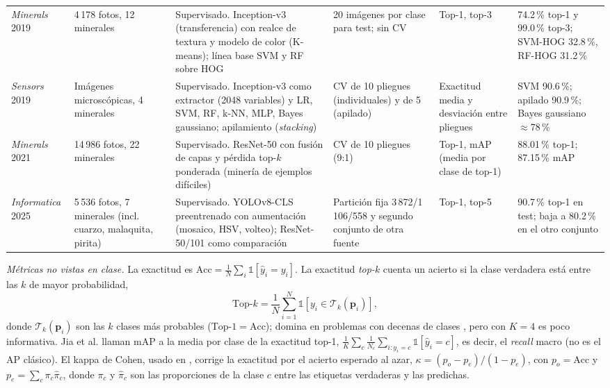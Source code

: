 \documentclass[journal]{IEEEtran}
\begin{document}
\begin{table}[!t]
\begin{tabular}{@{}p{1.55cm} p{2.25cm} p{4.0cm} p{1.9cm} p{1.5cm} p{4.4cm}@{}}
\cite{liu2019}\newline\emph{Minerals} 2019 & 4\,178 fotos, 12 minerales & Supervisado. Inception-v3 (transferencia) con realce de textura y modelo de color (K-means); línea base SVM y RF sobre HOG & 20 imágenes por clase para test; sin CV & Top-1, top-3 & 74.2\,\% top-1 y 99.0\,\% top-3; SVM-HOG 32.8\,\%, RF-HOG 31.2\,\%\\
\cite{zhang2019}\newline\emph{Sensors} 2019 & Imágenes microscópicas, 4 minerales & Supervisado. Inception-v3 como extractor (2048 variables) y LR, SVM, RF, k-NN, MLP, Bayes gaussiano; apilamiento (\emph{stacking}) & CV de 10 pliegues (individuales) y de 5 (apilado) & Exactitud media y desviación entre pliegues & SVM 90.6\,\%; apilado 90.9\,\%; Bayes gaussiano $\approx$78\,\%\\
\cite{jia2021}\newline\emph{Minerals} 2021 & 14\,986 fotos, 22 minerales & Supervisado. ResNet-50 con fusión de capas y pérdida top-$k$ ponderada (minería de ejemplos difíciles) & CV de 10 pliegues (9:1) & Top-1, mAP (media por clase de top-1) & 88.01\,\% top-1; 87.15\,\% mAP\\
\cite{long2025}\newline\emph{Informatica} 2025 & 5\,536 fotos, 7 minerales (incl. cuarzo, malaquita, pirita) & Supervisado. YOLOv8-CLS preentrenado con aumentación (mosaico, HSV, volteo); ResNet-50/101 como comparación & Partición fija 3\,872/1\,106/558 y segundo conjunto de otra fuente & Top-1, top-5 & 90.7\,\% top-1 en test; baja a 80.2\,\% en el otro conjunto\\
\bottomrule
\end{tabular}
\end{table}

\emph{Métricas no vistas en clase.} La exactitud es $\mathrm{Acc}=\tfrac1N\sum_{i}\mathbb 1[\hat y_i=y_i]$. La exactitud \emph{top-$k$} cuenta un acierto si la clase verdadera está entre las $k$ de mayor probabilidad,
\begin{equation}
\mathrm{Top}\text{-}k=\frac1N\sum_{i=1}^{N}\mathbb 1\!\left[y_i\in\mathcal T_k(\mathbf p_i)\right],
\end{equation}
donde $\mathcal T_k(\mathbf p_i)$ son las $k$ clases más probables ($\mathrm{Top}\text{-}1=\mathrm{Acc}$); domina en problemas con decenas de clases \cite{chow2022,jia2021,zeng2021,long2025}, pero con $K=4$ es poco informativa. Jia et al. \cite{jia2021} llaman mAP a la media por clase de la exactitud top-1, $\frac1K\sum_{c}\frac1{N_c}\sum_{i:y_i=c}\mathbb 1[\hat y_i=c]$, es decir, el \emph{recall} macro (no es el AP clásico). El kappa de Cohen, usado en \cite{maitre2019}, corrige la exactitud por el acierto esperado al azar, $\kappa=(p_o-p_e)/(1-p_e)$, con $p_o=\mathrm{Acc}$ y $p_e=\sum_{c}\pi_c\hat\pi_c$, donde $\pi_c$ y $\hat\pi_c$ son las proporciones de la clase $c$ entre las etiquetas verdaderas y las predichas.
\end{document}
